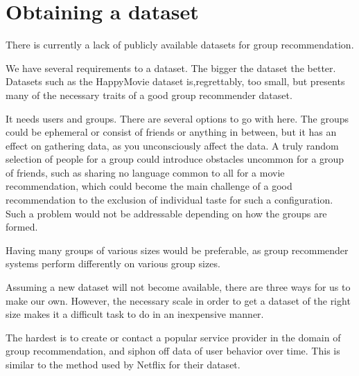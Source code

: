 \section{Obtaining a dataset}
There is currently a lack of publicly available datasets for group recommendation.

We have several requirements to a dataset. The bigger the dataset the better. Datasets such as the HappyMovie dataset is,regrettably, too small, but presents many of the necessary traits of a good group recommender dataset.

It needs users and groups. There are several options to go with here. The groups could be ephemeral or consist of friends or anything in between, but it has an effect on gathering data, as you unconsciously affect the data. A truly random selection of people for a group could introduce obstacles uncommon for a group of friends, such as sharing no language common to all for a movie recommendation, which could become the main challenge of a good recommendation to the exclusion of individual taste for such a configuration. Such a problem would not be addressable depending on how the groups are formed.

Having many groups of various sizes would be preferable, as group recommender systems perform differently on various group sizes.

Assuming a new dataset will not become available, there are three ways for us to make our own. However, the necessary scale in order to get a dataset of the right size makes it a difficult task to do in an inexpensive manner.

The hardest is to create or contact a popular service provider in the domain of group recommendation, and siphon off data of user behavior over time. This is similar to the method used by Netflix for their dataset.